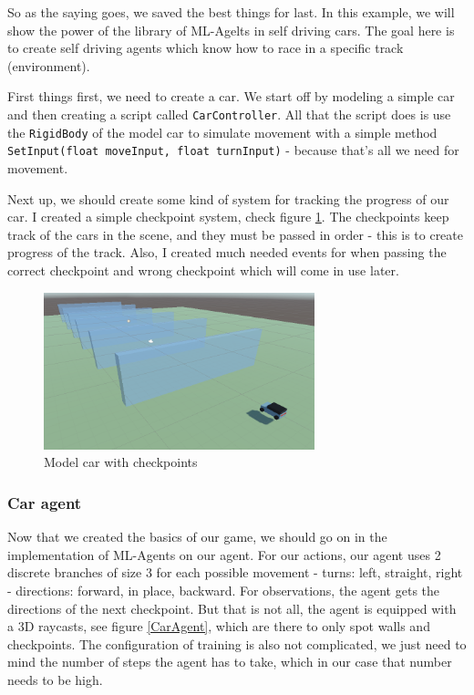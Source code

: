 \documentclass[a4paper, 12pt]{book}
\begin{document}
So as the saying goes, we saved the best things for last. In this example, we will show the power of the library of ML-Agelts \cite{MLAgents} in self driving cars. The goal here is to create self driving agents which know how to race in a specific track (environment).

First things first, we need to create a car. We start off by modeling a simple car and then creating a script called \texttt{CarController}. All that the script does is use the \texttt{RigidBody} of the model car to simulate movement with a simple method \texttt{SetInput(float moveInput, float turnInput)} - because that's all we need for movement.

Next up, we should create some kind of system for tracking the progress of our car. I created a simple checkpoint system, check figure \ref{CarWithCheckpoints}. The checkpoints keep track of the cars in the scene, and they must be passed in order - this is to create progress of the track. Also, I created much needed events for when passing the correct checkpoint and wrong checkpoint which will come in use later.

\begin{figure}[h]
\begin{center}
\includegraphics[width=0.7\textwidth]{Images/CarWithCheckpoints.png}
\end{center}
\caption{Model car with checkpoints}
\label{CarWithCheckpoints}
\end{figure}


\subsubsection{Car agent}

Now that we created the basics of our game, we should go on in the implementation of ML-Agents on our agent. For our actions, our agent uses 2 discrete branches of size 3 for each possible movement - turns: left, straight, right - directions: forward, in place, backward. For observations, the agent gets the directions of the next checkpoint. But that is not all, the agent is equipped with a 3D raycasts, see figure \ref{CarAgent}, which are there  to only spot walls and checkpoints. The configuration of training is also not complicated, we just need to mind the number of steps the agent has to take, which in our case that number needs to be high.
\end{document}

